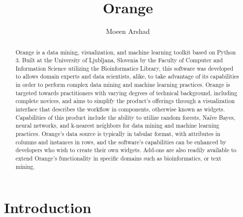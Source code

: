 
\title{Orange}


\author{Moeen Arshad}

\renewcommand{\shortauthors}{G. v. Laszewski}

\begin{abstract}

Orange is a data mining, visualization, and machine learning toolkit
based on Python 3. Built at the University of Ljubljana, Slovenia by
the Faculty of Computer and Information Science utilizing the
Bioinformatics Library, this software was developed to allows domain
experts and data scientists, alike, to take advantage of its capabilities
in order to perform complex data mining and machine learning practices.
Orange is targeted towards practitioners with varying degrees of technical
background, including complete novices, and aims to simplify the
product’s offerings through a visualization interface that describes
the workflow in components, otherwise known as widgets.  Capabilities of
this product include the ability to utilize random forests, Naïve Bayes,
neural networks, and k-nearest neighbors for data mining and machine
learning practices. Orange’s data source is typically in tabular format,
with attributes in columns and instances in rows, and the software’s
capabilities can be enhanced by developers who wish to create their
own widgets. Add-ons are also readily available to extend Orange's
functionality in specific domains such as bioinformatics, or text
mining.
\end{abstract}



\maketitle


\section{Introduction}

